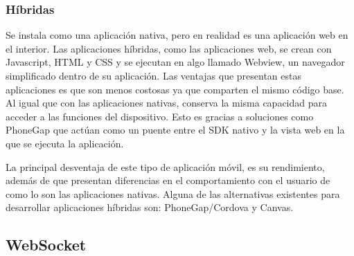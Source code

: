 	\subsubsection{Híbridas}
	Se instala como una aplicación nativa, pero en realidad es una aplicación web en el interior. Las aplicaciones híbridas, como las aplicaciones web, se crean con Javascript, HTML y CSS y se ejecutan en algo llamado Webview, un navegador simplificado dentro de su aplicación. 
	Las ventajas que presentan estas aplicaciones es que son menos costosas ya que comparten el mismo código base. Al igual que con las aplicaciones nativas, conserva la misma capacidad para acceder a las funciones del dispositivo. Esto es gracias a soluciones como PhoneGap que actúan como un puente entre el SDK nativo y la vista web en la que se ejecuta la aplicación. 
	
	La principal desventaja de este tipo de aplicación móvil, es su rendimiento, además de que presentan diferencias en el comportamiento con el usuario de como lo son las aplicaciones nativas. Alguna de las alternativas existentes para desarrollar aplicaciones híbridas son: PhoneGap/Cordova y Canvas.

\subsection{WebSocket}


\citep{websocket-html5}
\citep{websocket-scalability}
\citep{websocket-oreilly}

